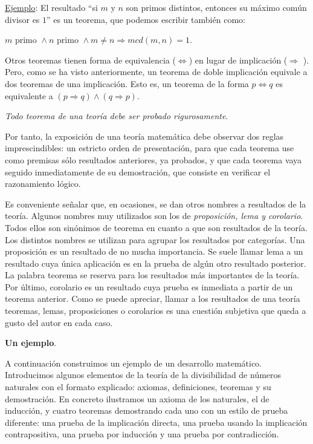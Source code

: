 \underline{Ejemplo}: El resultado “si $m$ y $n$ son primos distintos, entonces su máximo común divisor es $1$” es un teorema, que podemos escribir también como:

\hspace{2cm} $m \text{ primo } \wedge n \text{ primo } \wedge m \neq n \Rightarrow mcd(m,n)=1.$

Otros teoremas tienen forma de equivalencia ($ \Leftrightarrow $) en lugar de implicación ($\Rightarrow $ ). Pero, como se ha visto anteriormente, un teorema de doble implicación equivale a dos teoremas de una implicación. Esto es, un teorema de la forma $p \Leftrightarrow  q$ es equivalente a $(p \Rightarrow q) \wedge (q \Rightarrow p)$.

\emph{Todo teorema de una teoría debe ser probado rigurosamente}.

Por tanto, la exposición de una teoría matemática debe observar dos reglas imprescindibles: un estricto orden de presentación, para que cada teorema use como premisas sólo resultados anteriores, ya probados, y que cada teorema vaya seguido inmediatamente de su demostración, que consiste en verificar el razonamiento lógico.

Es conveniente señalar que, en ocasiones, se dan otros nombres a resultados de la teoría. Algunos nombres muy utilizados son los de \emph{proposición, lema y corolario}. Todos ellos son sinónimos de teorema en cuanto a que son resultados de la teoría. Los distintos nombres se utilizan para agrupar los resultados por categorías. Una proposición es un resultado de no mucha importancia. Se suele llamar lema a un resultado cuya única aplicación es en la prueba de algún otro resultado posterior. La palabra teorema se reserva para los resultados más importantes de la teoría. Por último, corolario es un resultado cuya prueba es inmediata a partir de un teorema anterior. Como se puede apreciar, llamar a los resultados de una teoría teoremas, lemas, proposiciones o corolarios es una cuestión subjetiva que queda a gusto del autor en cada caso.

\textbf{Un ejemplo}.

A continuación construimos un ejemplo de un desarrollo matemático. Introducimos algunos elementos de la teoría de la divisibilidad de números naturales con el formato explicado: axiomas, definiciones, teoremas y su demostración. En concreto ilustramos un axioma de los naturales, el de inducción, y cuatro teoremas demostrando cada uno con un estilo de prueba diferente: una prueba de la implicación directa, una prueba usando la implicación contrapositiva, una prueba por inducción y una prueba por contradicción.

